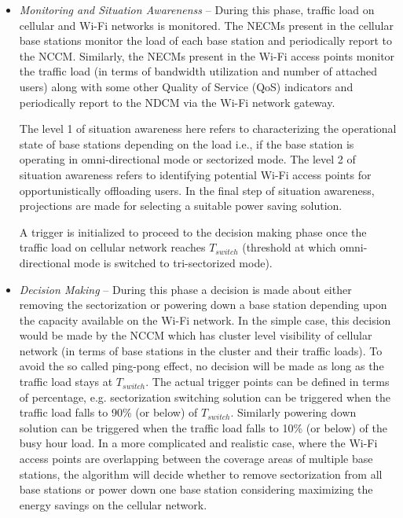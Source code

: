 \documentclass[journal]{IEEEtran}
\begin{document}
\begin{itemize}


\item \emph{Monitoring and Situation Awarenenss} -- During this phase, traffic load on cellular and Wi-Fi networks is monitored. The NECMs present in the cellular base stations monitor the load of each base station and periodically report to the NCCM. Similarly, the NECMs present in the Wi-Fi access points monitor the traffic load (in terms of bandwidth utilization and number of attached users) along with some other Quality of Service (QoS) indicators and periodically report to the NDCM via the Wi-Fi network gateway. 

The level 1 of situation awareness here refers to characterizing the operational state of base stations depending on the load i.e., if the base station is operating in omni-directional mode or sectorized mode. The level 2 of situation awareness refers to identifying potential Wi-Fi access points for opportunistically offloading users. In the final step of situation awareness, projections are made for selecting a suitable power saving solution. 

A trigger is initialized to proceed to the decision making phase once the traffic load on cellular network reaches $T_{switch}$ (threshold at which omni-directional mode is switched to tri-sectorized mode).

\item \emph{Decision Making} -- During this phase a decision is made about either removing the sectorization or powering down
a base station depending upon the capacity available on the Wi-Fi network. In the simple case, this decision would be made by the NCCM which has cluster level visibility of cellular network (in terms of base stations in the cluster and their traffic loads). To avoid the so called ping-pong effect, no decision will be made as long as the traffic load stays at $T_{switch}$.  The actual trigger points can be defined in terms of percentage, e.g. sectorization switching solution can be triggered when the traffic load falls to 90\% (or below) of $T_{switch}$. Similarly powering down solution can be triggered when the traffic load falls to 10\% (or below) of the busy hour load. In a more complicated and realistic case, where the Wi-Fi access points are overlapping between the coverage areas of multiple base stations, the algorithm will decide whether to remove sectorization from all base stations or power down one base station considering maximizing the energy savings on the cellular network.


\end{itemize}
\end{document}
